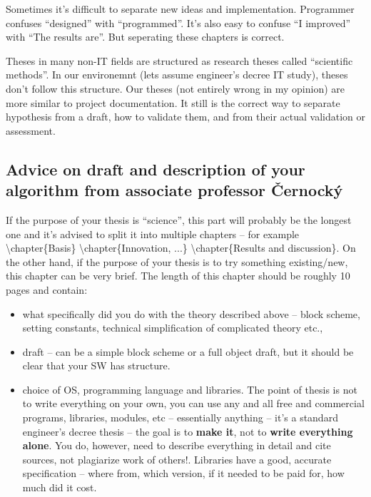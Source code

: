 {{Sometimes it's difficult to separate new ideas and implementation. Programmer confuses ``designed'' with ``programmed''.
It's also easy to confuse ``I improved'' with ``The results are''. But seperating these chapters is correct.

Theses in many non-IT fields are structured as research theses called ``scientific methods''. In our environemnt (lets assume engineer's decree IT study), theses don't follow this structure. Our theses (not entirely wrong in my opinion) are more similar to project documentation. It still is the correct way to separate hypothesis from a draft, how to validate them, and from their actual validation or assessment.


\subsection*{Advice on draft and description of your algorithm from associate professor Černocký}

If the purpose of your thesis is ``science'', this part will probably be the longest one and it's advised to split it into multiple chapters -- for example \textbackslash chapter\{Basis\} \textbackslash chapter\{Innovation, ...\} \textbackslash chapter\{Results and discussion\}. On the other hand, if the purpose of your thesis is to try something existing/new, this chapter can be very brief. The length of this chapter should be roughly 10 pages and contain:
\begin{itemize}
  \item{what specifically did you do with the theory described above -- block scheme, setting constants, technical simplification of complicated theory etc.,}
  \item{draft -- can be a simple block scheme or a full object draft, but it should be clear that your SW has structure.}
  \item{choice of OS, programming language and libraries. The point of thesis is not to write everything on your own, you can use any and all free and commercial programs, libraries, modules, etc -- essentially anything -- it's a standard engineer's decree thesis -- the goal is to \textbf{make it}, not to \textbf{write everything alone}. You do, however, need to describe everything in detail and cite sources, not plagiarize work of others!. Libraries have a good, accurate specification -- where from, which version, if it needed to be paid for, how much did it cost.}
\end{itemize}

}}
